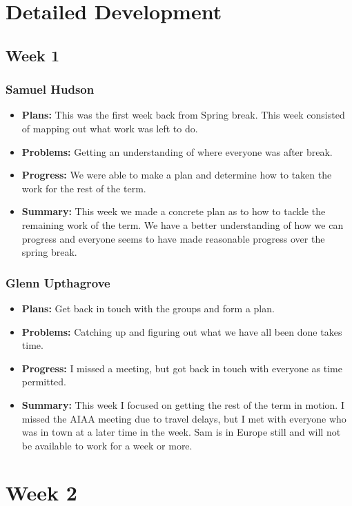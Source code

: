 \documentclass[onecolumn, draftclsnofoot,10pt, compsoc]{IEEEtran}
\begin{document}
\section {Detailed Development}
\subsection {Week 1}

\subsubsection{Samuel Hudson}
\begin {itemize}
 \item \textbf{Plans: }This was the first week back from Spring break. This week consisted of mapping out what work was left to do.   
 \item \textbf{Problems: }Getting an understanding of where everyone was after break.
 \item \textbf{Progress: }We were able to make a plan and determine how to taken the work for the rest of the term.
 \item \textbf{Summary: }This week we made a concrete plan as to how to tackle the remaining work of the term. We have a better understanding of how we can progress and everyone seems to have made reasonable progress over the spring break.  
\end {itemize}
\subsubsection{Glenn Upthagrove}
\begin {itemize}
 \item \textbf{Plans: }Get back in touch with the groups and form a plan.   
 \item \textbf{Problems: }Catching up and figuring out what we have all been done takes time.  
 \item \textbf{Progress: }I missed a meeting, but got back in touch with everyone as time permitted. 
 \item \textbf{Summary: }This week I focused on getting the rest of the term in motion. I missed the AIAA meeting due to travel delays, but I met with everyone who was in town at a later time in the week. Sam is in Europe still and will not be available to work for a week or more.  
\end {itemize}

\section{Week 2}
\end{document}
